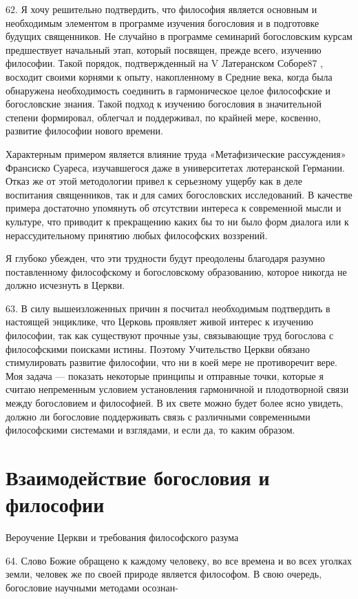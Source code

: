 \documentclass[a5paper,10pt]{article}
\begin{document}
62. Я хочу решительно подтвердить, что философия является основным и
необходимым элементом в программе изучения богословия и в подготовке будущих
священников. Не случайно в программе семинарий богословским курсам предшествует
начальный этап, который посвящен, прежде всего, изучению философии. Такой
порядок, подтвержденный на V Латеранском Соборе87 , восходит своими корнями к
опыту, накопленному в Средние века, когда была обнаружена необходимость
соединить в гармоническое целое философские и богословские знания. Такой подход
к изучению богословия в значительной степени формировал, облегчал и
поддерживал, по крайней мере, косвенно, развитие философии нового времени.

Характерным примером является влияние труда «Метафизические рассуждения»
Франсиско Суареса, изучавшегося даже в университетах лютеранской Германии.
Отказ же от этой методологии привел к серьезному ущербу как в деле воспитания
священников, так и для самих богословских исследований. В качестве примера
достаточно упомянуть об отсутствии интереса к современной мысли и культуре, что
приводит к прекращению каких бы то ни было форм диалога или к нерассудительному
принятию любых философских воззрений.

Я глубоко убежден, что эти трудности будут преодолены благодаря разумно
поставленному философскому и богословскому образованию, которое никогда не
должно исчезнуть в Церкви.

63. В силу вышеизложенных причин я посчитал необходимым подтвердить в настоящей
энциклике, что Церковь проявляет живой интерес к изучению философии, так как
существуют прочные узы, связывающие труд богослова с философскими поисками
истины. Поэтому Учительство Церкви обязано стимулировать развитие философии,
что ни в коей мере не противоречит вере. Моя задача — показать некоторые
принципы и отправные точки, которые я считаю непременным условием установления
гармоничной и плодотворной связи между богословием и философией. В их свете
можно будет более ясно увидеть, должно ли богословие поддерживать связь с
различными современными философскими системами и взглядами, и если да, то каким
образом.

\section{Взаимодействие богословия и философии}

Вероучение Церкви и требования философского разума

64. Слово Божие обращено к каждому человеку, во все времена и во всех уголках
земли, человек же по своей природе является философом. В свою очередь,
богословие научными методами осознан-
\end{document}

